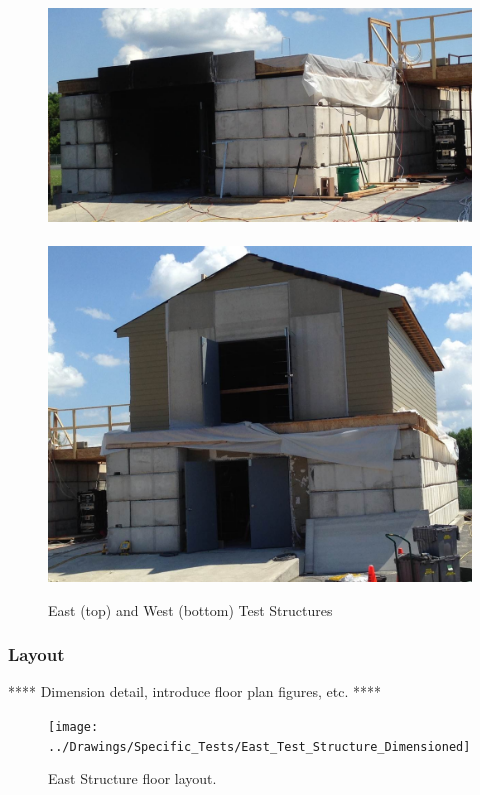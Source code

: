 \documentclass[12pt,oneside]{book}
\begin{document}
\begin{figure}[!ht]
\includegraphics[width=6in]{../Pictures/east_structure}
\\~\\
\includegraphics[width=6in]{../Pictures/west_structure}
\caption[East and West Test Structures]{East (top) and West (bottom) Test Structures}
\label{fig:struct_pics}
\end{figure}

\clearpage

\subsubsection{Layout}
\label{subsubsec:layout}
**** Dimension detail, introduce floor plan figures, etc. ****

\begin{figure}[!ht]
\texttt{[image: ../Drawings/Specific\_Tests/East\_Test\_Structure\_Dimensioned]}
\caption[East Structure Layout]{East Structure floor layout.}
\label{fig:east_general_plan}
\end{figure}
\end{document}
